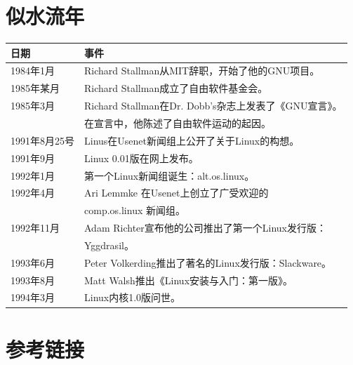 \documentclass[12pt,a4paper]{article}
\begin{document}
\section{似水流年}
\label{sec-7}


\begin{center}
\begin{tabular}{ll}
\hline
 日期           &  事件                                                   \\
\hline
 1984年1月      &  Richard Stallman从MIT辞职，开始了他的GNU项目。         \\
 1985年某月     &  Richard Stallman成立了自由软件基金会。                 \\
 1985年3月      &  Richard Stallman在Dr. Dobb's杂志上发表了《GNU宣言》。  \\
                &  在宣言中，他陈述了自由软件运动的起因。                 \\
 1991年8月25号  &  Linus在Usenet新闻组上公开了关于Linux的构想。           \\
 1991年9月      &  Linux 0.01版在网上发布。                               \\
 1992年1月      &  第一个Linux新闻组诞生：alt.os.linux。                  \\
 1992年4月      &  Ari Lemmke 在Usenet上创立了广受欢迎的                  \\
                &  comp.os.linux 新闻组。                                 \\
 1992年11月     &  Adam Richter宣布他的公司推出了第一个Linux发行版：      \\
                &  Yggdrasil。                                            \\
 1993年6月      &  Peter Volkerding推出了著名的Linux发行版：Slackware。   \\
 1993年8月      &  Matt Walsh推出《Linux安装与入门：第一版》。            \\
 1994年3月      &  Linux内核1.0版问世。                                   \\
\hline
\end{tabular}
\end{center}
\section{参考链接}
\label{sec-8}
\end{document}
